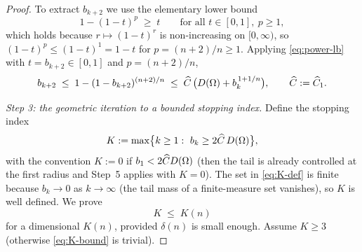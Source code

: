 \begin{proof}
To extract $b_{k+2}$ we use the elementary lower bound
\begin{equation}\label{eq:power-lb}
   1-(1-t)^{p}\;\ge\;t\qquad\text{for all }t\in[0,1],\ p\ge1,
\end{equation}
which holds because $r\mapsto(1-t)^{r}$ is non-increasing on $[0,\infty)$,
so $(1-t)^{p}\le(1-t)^{1}=1-t$ for $p=(n+2)/n\ge1$. Applying
\eqref{eq:power-lb} with $t=b_{k+2}\in[0,1]$ and $p=(n+2)/n$,
\begin{equation}\label{eq:bk2-bound}
   b_{k+2}\;\le\;1-(1-b_{k+2})^{(n+2)/n}
   \;\le\;\widehat C\,\bigl(D(\Omega)+b_k^{\,1+1/n}\bigr),
   \qquad \widehat C:=\widehat C_1 .
\end{equation}

\smallskip
\emph{Step 3: the geometric iteration to a bounded stopping index.}
Define the stopping index
\begin{equation}\label{eq:K-def}
   K:=\max\bigl\{k\ge1:\ b_k\ge2\widehat C\,D(\Omega)\bigr\},
\end{equation}
with the convention $K:=0$ if $b_1<2\widehat C D(\Omega)$ (then the tail is
already controlled at the first radius and Step~5 applies with $K=0$).
The set in \eqref{eq:K-def} is finite because $b_k\to0$ as $k\to\infty$
(the tail mass of a finite-measure set vanishes), so $K$ is well defined.
We prove
\begin{equation}\label{eq:K-bound}
   K\;\le\;K(n)
\end{equation}
for a dimensional $K(n)$, provided $\delta(n)$ is small enough. Assume
$K\ge3$ (otherwise \eqref{eq:K-bound} is trivial).


\end{proof}
